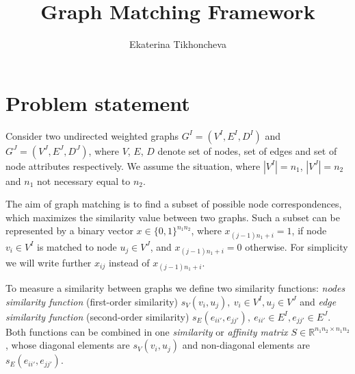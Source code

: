 \documentclass[
	fontsize=12pt,
	paper=a4,
	twoside=false,
	numbers=noenddot,
	plainheadsepline,
	toc=listof,
	toc=bibliography
]{scrartcl}
\begin{document}
\pagestyle{plain}

\title{Graph Matching Framework}
\author{Ekaterina Tikhoncheva}
\date{} 

\maketitle 

%

\section{Problem statement} \label{sec:prob_stat}
Consider two undirected weighted graphs $G^I = (V^I, E^I, D^I)$ and $G^J = (V^J, E^J, D^J)$, where $V$, $E$, $D$ denote set of nodes,
set of edges and set of node attributes respectively. We assume the situation, where $|V^I|=n_1$, $|V^J|=n_2$ and $n_1$ not necessary equal to $n_2$.

The aim of graph matching is to find a subset of possible node correspondences, which maximizes the similarity value between two graphs. Such a subset can be represented by a binary vector $x\in \{0,1\}^{n_1n_2}$, where $x_{(j-1)n_1+i}=1$, if node $v_i\in V^I$ is matched to node $u_j\in V^J$, and $x_{(j-1)n_1+i}=0$ otherwise. For simplicity we will write further $x_{ij}$ instead of $x_{(j-1)n_1+i}$.

To measure a similarity between graphs we define two similarity functions: \emph{nodes similarity function} (first-order similarity) $s_V(v_i, u_j),\ v_i\in V^I, u_j\in V^J$ and \emph{edge similarity function} (second-order similarity) $s_E(e_{ii\prime}, e_{jj\prime}),\ e_{ii\prime}\in E^I, e_{jj\prime}\in E^J$. Both functions can be combined in one \emph{similarity} or \emph{affinity matrix $S\in\mathbb{R}^{n_1n_2\times n_1n_2}$}, whose diagonal elements are $s_V(v_i, u_j)$ and non-diagonal elements are $s_E(e_{ii\prime}, e_{jj\prime})$.
\end{document}
